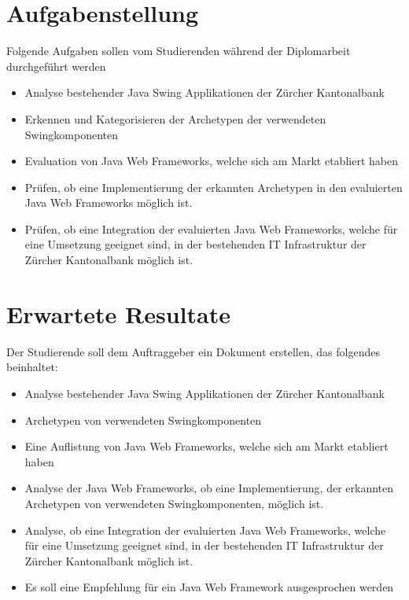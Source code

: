 \documentclass[listof=totoc,bibliography=totoc]{scrreprt}
\begin{document}
    \section{Aufgabenstellung}
    Folgende Aufgaben sollen vom Studierenden während der Diplomarbeit
    durchgeführt werden
    
    \begin{itemize}
        \item Analyse bestehender Java Swing Applikationen der Zürcher
        Kantonalbank
        \item Erkennen und Kategorisieren der Archetypen der verwendeten
        Swingkomponenten
        \item Evaluation von Java Web Frameworks, welche sich am Markt
        etabliert haben
        \item Prüfen, ob eine Implementierung der erkannten Archetypen in den
        evaluierten Java Web Frameworks möglich ist.
        \item Prüfen, ob eine Integration der evaluierten Java Web Frameworks,
        welche für eine Umsetzung geeignet sind, in der bestehenden IT
        Infrastruktur der Zürcher Kantonalbank möglich ist.
    \end{itemize}

    \section{Erwartete Resultate}
    Der Studierende soll dem Auftraggeber ein Dokument erstellen, das folgendes
    beinhaltet:

    \begin{itemize}    
        \item Analyse bestehender Java Swing Applikationen der Zürcher
        Kantonalbank
        \item Archetypen von verwendeten Swingkomponenten
        \item Eine Auflistung von Java Web Frameworks, welche sich am
        Markt etabliert haben
        \item Analyse der Java Web Frameworks, ob eine Implementierung, der
        erkannten Archetypen von verwendeten Swingkomponenten, möglich ist.
        \item Analyse, ob eine Integration der evaluierten Java Web Frameworks,
        welche für eine Umsetzung geeignet sind, in der bestehenden IT
        Infrastruktur der Zürcher Kantonalbank möglich ist.
        \item Es soll eine Empfehlung für ein Java Web Framework ausgesprochen
        werden
    \end{itemize}
\end{document}
